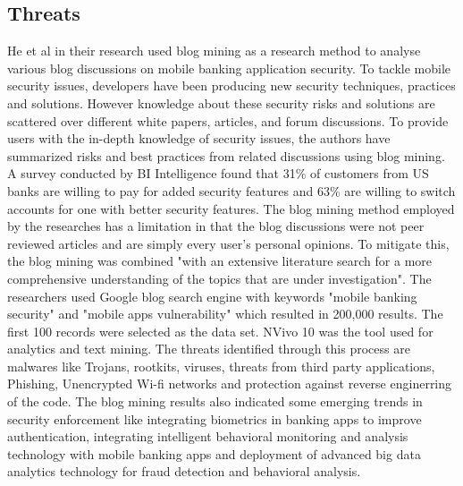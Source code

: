 \documentclass{mproj}
\begin{document}
\subsection{Threats}
He et al\cite{he2015} in their research used blog mining as a research method to analyse various blog discussions on mobile banking application security. To tackle mobile security issues, developers have been producing new security techniques, practices and solutions.  However knowledge about these security risks and solutions are scattered over different white papers, articles, and forum discussions. To provide users with the in-depth knowledge of security issues, the authors have summarized risks and best practices from related discussions using blog mining. A survey conducted by BI Intelligence\cite{businessinsider} found that 31\% of customers from US banks are willing to pay for added security features and 63\% are willing to switch accounts for one with better security features. The blog mining method employed by the researches has a limitation in that the blog discussions were not peer reviewed articles and are simply every user's personal opinions. To mitigate this, the blog mining was combined "with an extensive literature search for a more comprehensive understanding of the topics that are under investigation". The researchers used Google blog search engine with keywords "mobile banking security" and "mobile apps vulnerability" which resulted in 200,000 results. The first 100 records were selected as the data set. NVivo 10 was the tool used for analytics and text mining. The threats identified through this process are malwares like Trojans, rootkits, viruses, threats from third party applications, Phishing, Unencrypted Wi-fi networks and protection against reverse enginerring of the code. The blog mining results also indicated some emerging trends in security enforcement like integrating biometrics in banking apps to improve authentication, integrating intelligent behavioral monitoring and analysis technology with mobile banking apps and deployment of advanced big data analytics technology for fraud detection and behavioral analysis.
\end{document}

